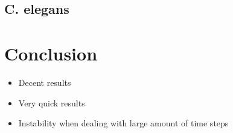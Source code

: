 \documentclass[14pt]{beamer}
\begin{document}
  \subsection{C. elegans}

  \begin{frame}{\insertsection}{\insertsubsection}
    \begin{center}
      
    \end{center}
  \end{frame}

  \begin{frame}{\insertsection}{\insertsubsection}
    \begin{center}
      
    \end{center}
  \end{frame}

  \section{Conclusion}

  \begin{frame}{\insertsection}
    \begin{itemize}
      \item Decent results
      \item Very quick results
      \item Instability when dealing with large amount of time steps
    \end{itemize}
  \end{frame}
\end{document}
